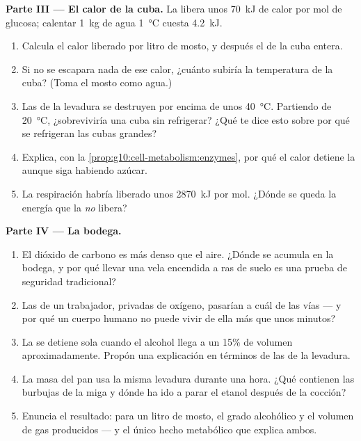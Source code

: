 \begin{problem}
\medskip
\noindent\textbf{Parte III --- El calor de la cuba.}
La  libera unos \qty{70}{kJ} de calor por mol de glucosa;
calentar \qty{1}{kg} de agua \qty{1}{\celsius} cuesta \qty{4.2}{kJ}.
\begin{enumerate}[resume]
  \item Calcula el calor liberado por litro de mosto, y después el de
        la cuba entera.
  \item Si no se escapara nada de ese calor, ¿cuánto subiría la
        temperatura de la cuba? (Toma el mosto como agua.)
  \item Las  de la levadura se destruyen por encima de unos
        \qty{40}{\celsius}. Partiendo de \qty{20}{\celsius}, ¿sobreviviría
        una cuba sin refrigerar? ¿Qué te dice esto sobre por qué se
        refrigeran las cubas grandes?
  \item Explica, con la \cref{prop:g10:cell-metabolism:enzymes}, por
        qué el calor detiene la  aunque siga habiendo
        azúcar.
  \item La respiración habría liberado unos \qty{2870}{kJ} por mol.
        ¿Dónde se queda la energía que la  \emph{no}
        libera?
\end{enumerate}

\medskip
\noindent\textbf{Parte IV --- La bodega.}
\begin{enumerate}[resume]
  \item El dióxido de carbono es más denso que el aire. ¿Dónde se
        acumula en la bodega, y por qué llevar una vela encendida a
        ras de suelo es una prueba de seguridad tradicional?
  \item Las  de un trabajador, privadas de oxígeno, pasarían a
        cuál de las vías --- y por qué un cuerpo humano no puede vivir
        de ella más que unos minutos?
  \item La  se detiene sola cuando el alcohol llega a un
        15\% de volumen aproximadamente. Propón una explicación en
        términos de las  de la levadura.
  \item La masa del pan usa la misma levadura durante una hora. ¿Qué
        contienen las burbujas de la miga y dónde ha ido a parar el
        etanol después de la cocción?
  \item Enuncia el resultado: para un litro de mosto, el grado
        alcohólico y el volumen de gas producidos --- y el único hecho
        metabólico que explica ambos.
\end{enumerate}
\end{problem}
